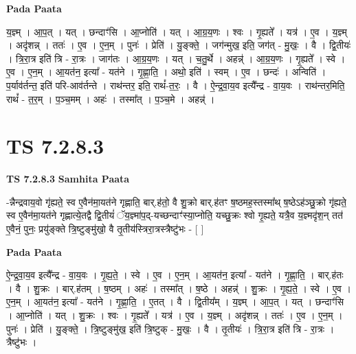 \documentclass[17pt]{extarticle}
\begin{document}
\textbf{Pada Paata} \newline

य॒ज्ञ्म् । आ॒प॒त् । यत् । छन्दाꣳ॑सि । आ॒प्नोति॑ । यत् । आ॒ग्र॒य॒णः । श्वः । गृ॒ह्यते᳚ । यत्र॑ । ए॒व । य॒ज्ञ्म् । अदृ॑शन्न् । ततः॑ । ए॒व । ए॒न॒म् । पुनः॑ । प्रेति॑ । यु॒ङ्क्ते॒ । जग॑न्मुख॒ इति॒ जग॑त् - मु॒खः॒ । वै । द्वि॒तीयः॑ । त्रि॒रा॒त्र इति॑ त्रि - रा॒त्रः । जाग॑तः । आ॒ग्र॒य॒णः । यत् । च॒तु॒र्थे । अहन्न्॑ । आ॒ग्र॒य॒णः । गृ॒ह्यते᳚ । स्वे । ए॒व । ए॒न॒म् । आ॒यत॑न॒ इत्या᳚ - यत॑ने । गृ॒ह्णा॒ति॒ । अथो॒ इति॑ । स्वम् । ए॒व । छन्दः॑ । अन्विति॑ । प॒र्याव॑र्तन्त॒ इति॑ परि-आव॑र्तन्ते । राथ॑न्तर॒ इति॒ राथं᳚-त॒रः॒ । वै । ऐ॒न्द्र॒वा॒य॒व इत्यै᳚न्द्र - वा॒य॒वः । राथ॑न्तर॒मिति॒ राथं᳚ - त॒र॒म् । प॒ञ्च॒मम् । अहः॑ । तस्मा᳚त् । प॒ञ्च॒मे । अहन्न्॑ ।  \newline





\section{ TS 7.2.8.3 }

\textbf{TS 7.2.8.3 } \newline
\textbf{Samhita Paata} \newline

-न्नैन्द्रवाय॒वो गृ॑ह्यते॒ स्व ए॒वैन॑मा॒यत॑ने गृह्णाति॒ बार्.ह॑तो॒ वै शु॒क्रो बार्.ह॑तꣳ ष॒ष्ठमह॒स्तस्मा᳚थ् ष॒ष्ठेऽह॑ञ्छु॒क्रो गृ॑ह्यते॒ स्व ए॒वैन॑मा॒यत॑ने गृह्णात्ये॒तद्वै द्वि॒तीयं॑ ॅय॒ज्ञ्मा॑प॒द्-यच्छन्दाꣳ॑स्या॒प्नोति॒ यच्छु॒क्रः श्वो गृ॒ह्यते॒ यत्रै॒व य॒ज्ञ्मदृ॑श॒न् तत॑ ए॒वैनं॒ पुनः॒ प्रयु॑ङ्क्ते त्रि॒ष्टुङ्मु॑खो॒ वै तृ॒तीय॑स्त्रिरा॒त्रस्त्रैष्टु॑भः - [  ] \newline

\textbf{Pada Paata} \newline

ऐ॒न्द्र॒वा॒य॒व इत्यै᳚न्द्र - वा॒य॒वः । गृ॒ह्य॒ते॒ । स्वे । ए॒व । ए॒न॒म् । आ॒यत॑न॒ इत्या᳚ - यत॑ने । गृ॒ह्णा॒ति॒ । बार्.ह॑तः । वै । शु॒क्रः । बार्.ह॑तम् । ष॒ष्ठम् । अहः॑ । तस्मा᳚त् । ष॒ष्ठे । अहन्न्॑ । शु॒क्रः । गृ॒ह्य॒ते॒ । स्वे । ए॒व । ए॒न॒म् । आ॒यत॑न॒ इत्या᳚ - यत॑ने । गृ॒ह्णा॒ति॒ । ए॒तत् । वै । द्वि॒तीय᳚म् । य॒ज्ञ्म् । आ॒प॒त् । यत् । छन्दाꣳ॑सि । आ॒प्नोति॑ । यत् । शु॒क्रः । श्वः । गृ॒ह्यते᳚ । यत्र॑ । ए॒व । य॒ज्ञ्म् । अदृ॑शन्न् । ततः॑ । ए॒व । ए॒न॒म् । पुनः॑ । प्रेति॑ । यु॒ङ्क्ते॒ । त्रि॒ष्टुङ्मु॑ख॒ इति॑ त्रि॒ष्टुक् - मु॒खः॒ । वै । तृ॒तीयः॑ । त्रि॒रा॒त्र इति॑ त्रि - रा॒त्रः । त्रैष्टु॑भः ।  \newline
\end{document}
